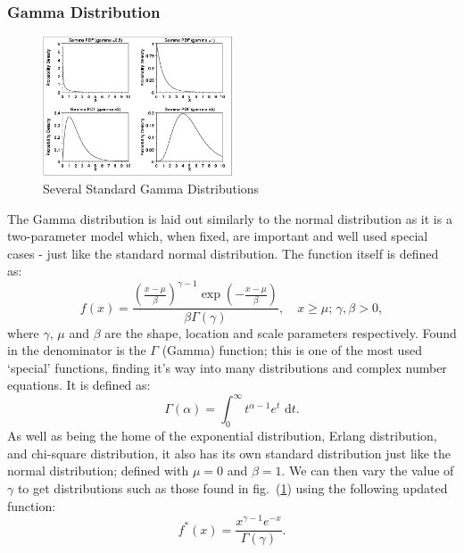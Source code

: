 \documentclass{article}
\begin{document}
\subsubsection{Gamma Distribution}
\begin{figure}[H]
\centering
\includegraphics[width=0.5\textwidth]{images/gampdf4.png}
\caption{Several Standard Gamma Distributions} \label{fig:stand_gam_dis}
\end{figure}
The Gamma distribution is laid out similarly to the normal distribution as it is a two-parameter model which, when fixed, are important and well used special cases - just like the standard normal distribution. The function itself is defined as:
\begin{equation}
    f(x) = \frac{\left( \frac{x-\mu}{\beta} \right)^{\gamma -1}\exp{\left( -\frac{x-\mu}{\beta} \right)}}{\beta\Gamma(\gamma)},\quad x\geq\mu;\, \gamma,\beta>0,
\end{equation}
where $\gamma,\,\mu$ and $\beta$ are the shape, location and scale parameters respectively. Found in the denominator is the $\Gamma$ (Gamma) function; this is one of the most used `special' functions, finding it's way into many distributions and complex number equations. It is defined as:
\begin{equation}
    \Gamma(\alpha) = \int_0^\infty t^{\alpha-1}e^t\text{ d}t.
\end{equation}
As well as being the home of the exponential distribution, Erlang distribution, and chi-square distribution, it also has its own standard distribution just like the normal distribution; defined with $\mu=0$ and $\beta=1$. We can then vary the value of $\gamma$ to get distributions such as those found in fig.~(\ref{fig:stand_gam_dis}) using the following updated function:
\begin{equation}
    f^*(x) = \frac{x^{\gamma-1}e^{-x}}{\Gamma(\gamma)}.
\end{equation}
\end{document}
